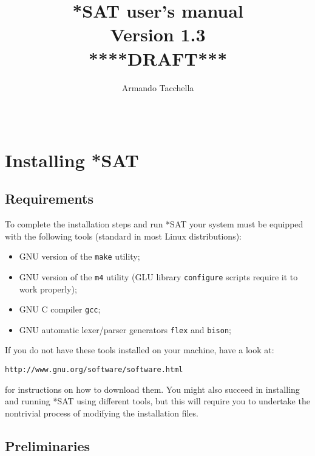 \documentclass[12pt]{report}
\title{\textbf{*SAT user's manual \\ Version 1.3 \\ ****DRAFT***}}
\date{\ }
\author{Armando Tacchella}
\begin{document}
\maketitle
\clearpage

\tableofcontents
\clearpage

\chapter{Installing *SAT}

\section{Requirements}
\label{sec:requirements}

To complete the installation steps and run *SAT your system 
must be equipped with the following tools (standard in most Linux
distributions):
\begin{itemize}
\item GNU version of the {\tt make} utility;
\item GNU version of the {\tt m4} utility (GLU library 
\texttt{configure} scripts require it to work properly);
\item GNU C compiler {\tt gcc}; 
\item GNU automatic lexer/parser generators {\tt flex} and {\tt bison}; 
\end{itemize}
If you do not have these tools installed on your machine, have a look 
at:
\begin{alltt}
http://www.gnu.org/software/software.html
\end{alltt} 
for instructions on how to download them. You might also succeed in
installing and running *SAT using different tools, but this will
require you to undertake the nontrivial process of 
modifying the installation files. 

\section{Preliminaries}
\label{sec:preliminaries}
\end{document}
